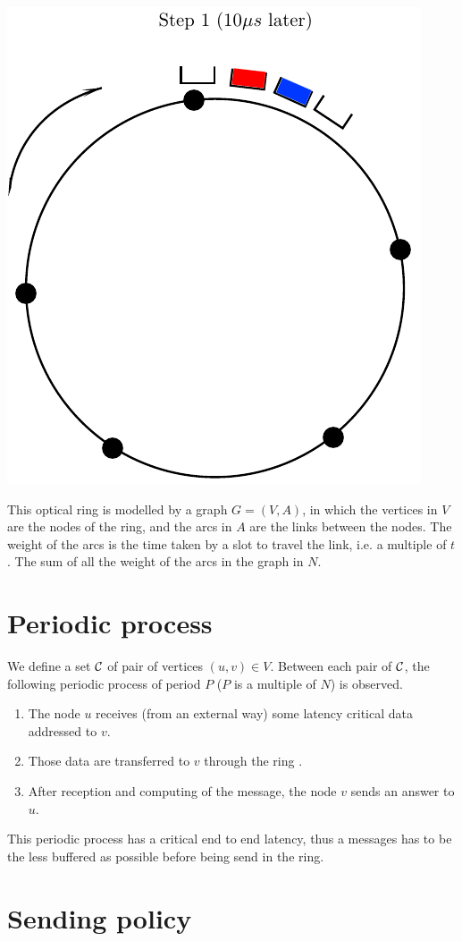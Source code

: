 \documentclass[a4paper,10pt]{article}
\begin{document}
\begin{center}
      \includegraphics[scale=0.5]{anneau2.pdf}
  
\end{center}
This optical ring is modelled by a graph $G=(V,A)$, in which the vertices in $V$ are the nodes of the ring, and the arcs in $A$ are the links between the nodes. The weight of the arcs is the time taken by a slot to travel the link, i.e. a multiple of $t$. The sum of all the weight of the arcs in the graph in $N$.

\section*{Periodic process}
We define a set $\cal C$ of pair of vertices $(u,v) \in V$. Between each pair of $\cal C$, the following periodic process of period $P$ ($P$ is a multiple of $N$) is observed.
\begin{enumerate}
 \item The node $u$ receives (from an external way) some latency critical data addressed to $v$.
 \item Those data are transferred to $v$ through the ring .
 \item After reception and computing of the message, the node $v$ sends an answer to $u$.
\end{enumerate}
 This periodic process has a critical end to end latency, thus a messages has to be the less buffered as possible before being send in the ring.
 
\section*{Sending policy}

\section*{}
\end{document}
